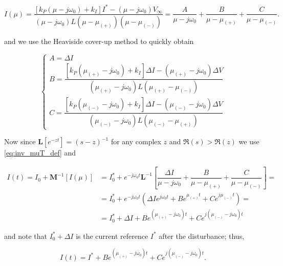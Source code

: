 \begin{equation} I(\mu) = \dfrac{\left[k_P\left(\mu - j\omega_0\right) + k_I\right]I^* - \left(\mu - j\omega_0\right) V_\infty}{\left(\mu - j\omega_0\right)L\left(\mu - \mu_{(+)}\right)\left(\mu - \mu_{(-)}\right)} = \dfrac{A}{\mu - j\omega_0} + \dfrac{B}{\mu - \mu_{(+)}} + \dfrac{C}{\mu - \mu_{(-)}} .\label{eq:dpo_i_mimo_const_part_fracs} \end{equation}

	\noindent and we use the Heaviside cover-up method  to quickly obtain

\begin{equation}
	\left\{\begin{array}{l}
		A = \Delta I\\[5mm]
		B = \dfrac{\left[k_P\left(\mu_{(+)} - j\omega_0\right) + k_I\right]\Delta I - \left(\mu_{(+)} - j\omega_0\right) \Delta V}{\left(\mu_{(+)} - j\omega_0\right)L\left(\mu_{(+)} - \mu_{(-)}\right)} \\[10mm]
		C = \dfrac{\left[k_P\left(\mu_{(-)} - j\omega_0\right) + k_I\right]\Delta I - \left(\mu_{(-)} - j\omega_0\right) \Delta V}{\left(\mu_{(-)} - j\omega_0\right)L\left(\mu_{(-)} - \mu_{(+)}\right)} 
	\end{array}\right.
\end{equation}

	Now since $\mathbf{L}\left[e^{-zt}\right] = \left(s - z\right)^{-1}$ for any complex $z$ and $\Re(s) > \Re(z)$ we use \eqref{eq:inv_muT_def} and

\begin{align}
	I(t) = I_0 + \mathbf{M}^{-1}\left[I(\mu)\right] &= I_0^* + e^{-j\omega_0 t} \mathbf{L}^{-1}\left[\dfrac{\Delta I}{\mu - j\omega_0} + \dfrac{B}{\mu - \mu_{(+)}} + \dfrac{C}{\mu - \mu_{(-)}}\right] = \nonumber\\[5mm]
%
	&= I_0^* + e^{-j\omega_0 t}\left(\Delta Ie^{j\omega_0 t} + Be^{\mu_{(+)}t} + Ce^{j\mu_{(-)}t}\right) = \nonumber\\[5mm]
%
	&= I_0^* + \Delta I + Be^{\left(\mu_{(+)} - j\omega_0\right)t} + Ce^{j\left(\mu_{(-)} - j\omega_0\right)t}
\end{align}

	\noindent and note that $I_0^* + \Delta I$ is the current reference $I^*$ after the disturbance; thus,

\begin{equation} I(t) = I^* + Be^{\left(\mu_{(+)} - j\omega_0\right)t} + Ce^{j\left(\mu_{(-)} - j\omega_0\right)t}. \end{equation}


